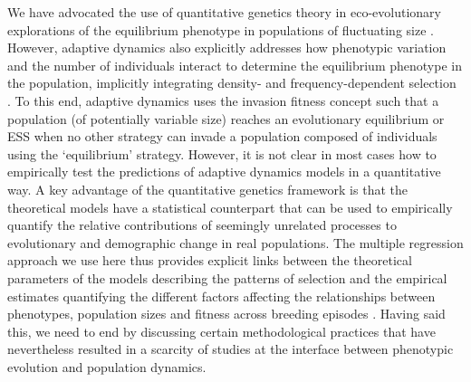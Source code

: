 \documentclass{article}
\begin{document}
We have advocated the use of quantitative genetics theory in eco-evolutionary explorations of the equilibrium phenotype in populations of fluctuating size \citep{Engen2013, Engen2020, Lande2017, Lande2009a}. However, adaptive dynamics also explicitly addresses how phenotypic variation and the number of individuals interact to determine the equilibrium phenotype in the population, implicitly integrating density- and frequency-dependent selection \citep{McGill2007}. To this end, adaptive dynamics uses the invasion fitness concept \citep[for its link to other fitness measures, see][]{Lehmann2016} such that a population (of potentially variable size) reaches an evolutionary equilibrium or ESS when no other strategy can invade a population composed of individuals using the `equilibrium' strategy. However, it is not clear in most cases how to empirically test the predictions of adaptive dynamics models in a quantitative way. A key advantage of the quantitative genetics framework is that the theoretical models have a statistical counterpart that can be used to empirically quantify the relative contributions of seemingly unrelated processes to evolutionary and demographic change in real populations. The multiple regression approach we use here thus provides explicit links between the theoretical parameters of the models describing the patterns of selection and the empirical estimates quantifying the different factors affecting the relationships between phenotypes, population sizes and fitness across breeding episodes \citep{Lande1983, Queller1992b, Wolf1999SocialSelection, Heisler1987, Goodnight1992}. Having said this, we need to end by discussing certain methodological practices that have nevertheless resulted in a scarcity of studies at the interface between phenotypic evolution and population dynamics.
\end{document}
